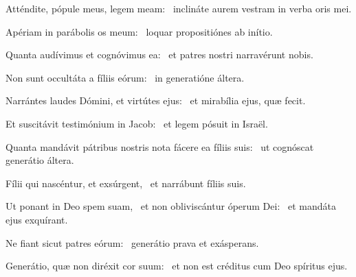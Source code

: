 \item Atténdite, pópule meus, legem meam:~\psstar{} inclináte aurem vestram in verba oris mei.

\item Apériam in parábolis os meum:~\psstar{} loquar propositiónes ab inítio.

\item Quanta audívimus et cognóvimus ea:~\psstar{} et patres nostri narravérunt nobis.

\item Non sunt occultáta a fíliis eórum:~\psstar{} in generatióne áltera.

\item Narrántes laudes Dómini, et virtútes ejus:~\psstar{} et mirabília ejus, quæ fecit.

\item Et suscitávit testimónium in Jacob:~\psstar{} et legem pósuit in Israël.

\item Quanta mandávit pátribus nostris nota fácere ea fíliis suis:~\psstar{} ut cognóscat generátio áltera.

\item Fílii qui nascéntur, et exsúrgent,~\psstar{} et narrábunt fíliis suis.

\item Ut ponant in Deo spem suam,~\pscross{} et non obliviscántur óperum Dei:~\psstar{} et mandáta ejus exquírant.

\item Ne fiant sicut patres eórum:~\psstar{} generátio prava et exásperans.

\item Generátio, quæ non diréxit cor suum:~\psstar{} et non est créditus cum Deo spíritus ejus.
